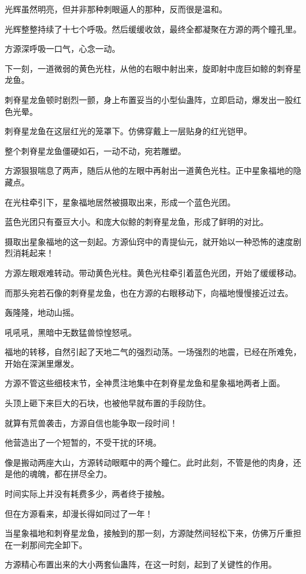 \begin{this_body}
光辉虽然明亮，但并非那种刺眼逼人的那种，反而很是温和。

光辉整整持续了十七个呼吸。然后缓缓收敛，最终全都凝聚在方源的两个瞳孔里。

方源深呼吸一口气，心念一动。

下一刻，一道微弱的黄色光柱，从他的右眼中射出来，旋即射中庞巨如鲸的刺脊星龙鱼。

刺脊星龙鱼顿时剧烈一颤，身上布置妥当的小型仙蛊阵，立即启动，爆发出一股红色光晕。

刺脊星龙鱼在这层红光的笼罩下。仿佛穿戴上一层贴身的红光铠甲。

整个刺脊星龙鱼僵硬如石，一动不动，宛若雕塑。

方源狠狠喘息了两声，随后从他的左眼中再射出一道黄色光柱。正中星象福地的隐藏点。

在光柱牵引下，星象福地居然被摄取出来，形成一个蓝色光团。

蓝色光团只有蚕豆大小。和庞大似鲸的刺脊星龙鱼，形成了鲜明的对比。

摄取出星象福地的这一刻起。方源仙窍中的青提仙元，就开始以一种恐怖的速度剧烈消耗起来！

方源左眼艰难转动。带动黄色光柱。黄色光柱牵引着蓝色光团，开始了缓缓移动。

而那头宛若石像的刺脊星龙鱼，也在方源的右眼移动下，向福地慢慢接近过去。

轰隆隆，地动山摇。

吼吼吼，黑暗中无数猛兽惊惶怒吼。

福地的转移，自然引起了天地二气的强烈动荡。一场强烈的地震，已经在所难免，开始在深渊里爆发。

方源不管这些细枝末节，全神贯注地集中在刺脊星龙鱼和星象福地两者上面。

头顶上砸下来巨大的石块，也被他早就布置的手段防住。

就算有荒兽袭击，方源自信也能争取一段时间！

他营造出了一个短暂的，不受干扰的环境。

像是搬动两座大山，方源转动眼眶中的两个瞳仁。此时此刻，不管是他的肉身，还是他的魂魄，都在拼尽全力。

时间实际上并没有耗费多少，两者终于接触。

但在方源看来，却漫长得如同过了一年！

当星象福地和刺脊星龙鱼，接触到的那一刻，方源陡然间轻松下来，仿佛万斤重担在一刹那间完全卸下。

方源精心布置出来的大小两套仙蛊阵，在这一时刻，起到了关键性的作用。


\end{this_body}
